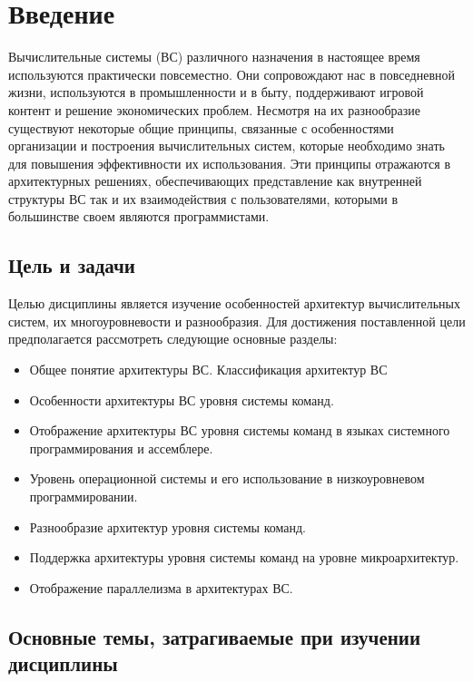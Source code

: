
\chapter* {Введение}

Вычислительные системы (ВС) различного назначения в настоящее время используются практически повсеместно. Они сопровождают нас в повседневной жизни, используются в промышленности и в быту, поддерживают игровой контент и решение экономических проблем. Несмотря на их разнообразие существуют некоторые общие принципы, связанные с особенностями организации и построения вычислительных систем, которые необходимо знать для повышения эффективности их использования. Эти принципы отражаются в архитектурных решениях, обеспечивающих представление как внутренней структуры ВС так и их взаимодействия с пользователями, которыми в большинстве своем являются программистами.

\section*{Цель и задачи}

Целью дисциплины является изучение особенностей архитектур вычислительных систем, их многоуровневости и разнообразия. Для достижения поставленной цели предполагается рассмотреть следующие основные разделы:

\begin{itemize}
 \item Общее понятие архитектуры ВС. Классификация архитектур ВС
 \item Особенности архитектуры ВС уровня системы команд.
 \item Отображение архитектуры ВС уровня системы команд в языках системного программирования и ассемблере.
 \item Уровень операционной системы и его использование в низкоуровневом программировании.
 \item Разнообразие архитектур уровня системы команд.
 \item Поддержка архитектуры уровня системы команд на уровне микроархитектур.
 \item Отображение параллелизма в архитектурах ВС.
\end{itemize}


\section*{Основные темы, затрагиваемые при изучении дисциплины}

